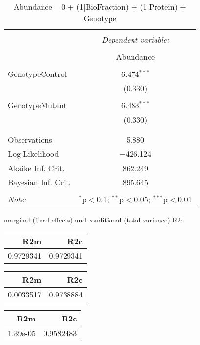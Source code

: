 \documentclass[11pt]{report}
\begin{document}
\begin{table}[!htbp] \centering 
  \caption{Abundance ~ 0 + (1|BioFraction) + (1|Protein) + Genotype} 
  \label{} 
\begin{tabular}{@{\extracolsep{5pt}}lc} 
\\[-1.8ex]\hline 
\hline \\[-1.8ex] 
 & \multicolumn{1}{c}{\textit{Dependent variable:}} \\ 
\cline{2-2} 
\\[-1.8ex] & Abundance \\ 
\hline \\[-1.8ex] 
 GenotypeControl & 6.474$^{***}$ \\ 
  & (0.330) \\ 
  & \\ 
 GenotypeMutant & 6.483$^{***}$ \\ 
  & (0.330) \\ 
  & \\ 
\hline \\[-1.8ex] 
Observations & 5,880 \\ 
Log Likelihood & $-$426.124 \\ 
Akaike Inf. Crit. & 862.249 \\ 
Bayesian Inf. Crit. & 895.645 \\ 
\hline 
\hline \\[-1.8ex] 
\textit{Note:}  & \multicolumn{1}{r}{$^{*}$p$<$0.1; $^{**}$p$<$0.05; $^{***}$p$<$0.01} \\ 
\end{tabular} 
\end{table} 
marginal (fixed effects) and conditional (total variance) R2:

\begin{tabular}{r|r}
\hline
R2m & R2c\\
\hline
0.9729341 & 0.9729341\\
\hline
\end{tabular}

\begin{tabular}{r|r}
\hline
R2m & R2c\\
\hline
0.0033517 & 0.9738884\\
\hline
\end{tabular}

\begin{tabular}{r|r}
\hline
R2m & R2c\\
\hline
1.39e-05 & 0.9582483\\
\hline
\end{tabular}
\end{document}
